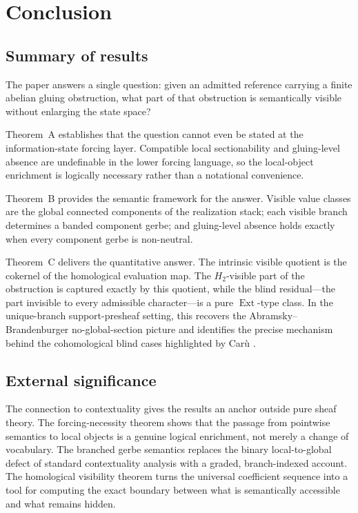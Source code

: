 \section{Conclusion}\label{sec:conclusion}

\subsection*{Summary of results}

The paper answers a single question: given an admitted reference carrying a finite abelian gluing obstruction, what part of that obstruction is semantically visible without enlarging the state space?

Theorem~A establishes that the question cannot even be stated at the information-state forcing layer. Compatible local sectionability and gluing-level absence are undefinable in the lower forcing language, so the local-object enrichment is logically necessary rather than a notational convenience.

Theorem~B provides the semantic framework for the answer. Visible value classes are the global connected components of the realization stack; each visible branch determines a banded component gerbe; and gluing-level absence holds exactly when every component gerbe is non-neutral.

Theorem~C delivers the quantitative answer. The intrinsic visible quotient is the cokernel of the homological evaluation map. The $H_2$-visible part of the obstruction is captured exactly by this quotient, while the blind residual---the part invisible to every admissible character---is a pure $\operatorname{Ext}$-type class. In the unique-branch support-presheaf setting, this recovers the Abramsky--Brandenburger no-global-section picture and identifies the precise mechanism behind the cohomological blind cases highlighted by Car\`u \cite{Caru2017}.

\subsection*{External significance}

The connection to contextuality gives the results an anchor outside pure sheaf theory. The forcing-necessity theorem shows that the passage from pointwise semantics to local objects is a genuine logical enrichment, not merely a change of vocabulary. The branched gerbe semantics replaces the binary local-to-global defect of standard contextuality analysis with a graded, branch-indexed account. The homological visibility theorem turns the universal coefficient sequence into a tool for computing the exact boundary between what is semantically accessible and what remains hidden.

